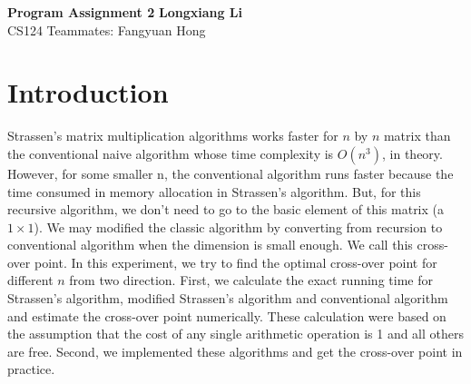 \documentclass[a4paper, 11pt]{article}
\begin{document}
\noindent
\large\textbf{Program Assignment 2} \hfill \textbf{Longxiang Li} \\
\normalsize CS124 \hfill Teammates: Fangyuan Hong \\

\section*{Introduction}
Strassen's matrix multiplication algorithms works faster for $n$ by $n$ matrix than the conventional naive algorithm whose time complexity is $O(n^3)$, in theory. However, for some smaller n, the conventional algorithm runs faster because the time consumed in memory allocation in Strassen's algorithm. But, for this recursive algorithm, we don't need to go to the basic element of this matrix (a $1\times1$). We may modified the classic algorithm by converting from recursion to conventional algorithm when the dimension is small enough. We call this cross-over point. In this experiment, we try to find the optimal cross-over point for different $n$ from two direction. First, we calculate the exact running time for Strassen's algorithm, modified Strassen's algorithm and conventional algorithm and estimate the cross-over point numerically. These calculation were based on the assumption that the cost of any single arithmetic operation is 1 and all others are free. Second, we implemented these algorithms and get the cross-over point in practice.
\end{document}
